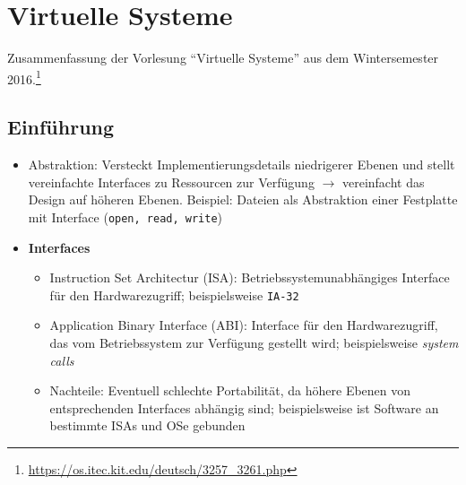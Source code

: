\chapter{Virtuelle Systeme}

Zusammenfassung der Vorlesung "`Virtuelle Systeme"' aus dem Wintersemester 2016.\footnote{\url{https://os.itec.kit.edu/deutsch/3257_3261.php}}

\section{Einführung}
\begin{itemize}
	\item Abstraktion: Versteckt Implementierungsdetails niedrigerer Ebenen und stellt vereinfachte Interfaces zu Ressourcen zur Verfügung \(\rightarrow\) vereinfacht das Design auf höheren Ebenen. Beispiel: Dateien als Abstraktion einer Festplatte mit Interface (\texttt{open, read, write})
	\item \textbf{Interfaces}
	\begin{itemize}
		\item Instruction Set Architectur (ISA): Betriebssystemunabhängiges Interface für den Hardwarezugriff; beispielsweise \texttt{IA-32}
		\item Application Binary Interface (ABI): Interface für den Hardwarezugriff, das vom Betriebssystem zur Verfügung gestellt wird; beispielsweise \textit{system calls}
		\item Nachteile: Eventuell schlechte Portabilität, da höhere Ebenen von entsprechenden Interfaces abhängig sind; beispielsweise ist Software an bestimmte ISAs und OSe gebunden
	\end{itemize}
\end{itemize}


